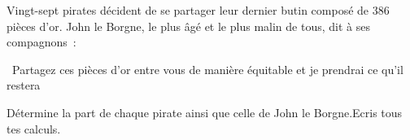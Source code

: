 %
%
Vingt-sept pirates décident de se partager leur dernier butin composé de 386 pièces d'or. John le Borgne, le plus âgé et le plus malin de tous, dit à ses compagnons~:
    \begin{emph}
        \og~Partagez ces pièces d'or entre vous de manière équitable et je prendrai ce qu'il restera~\fg
    \end{emph}
    Détermine la part de chaque pirate ainsi que celle de John le Borgne.Ecris tous tes calculs.
